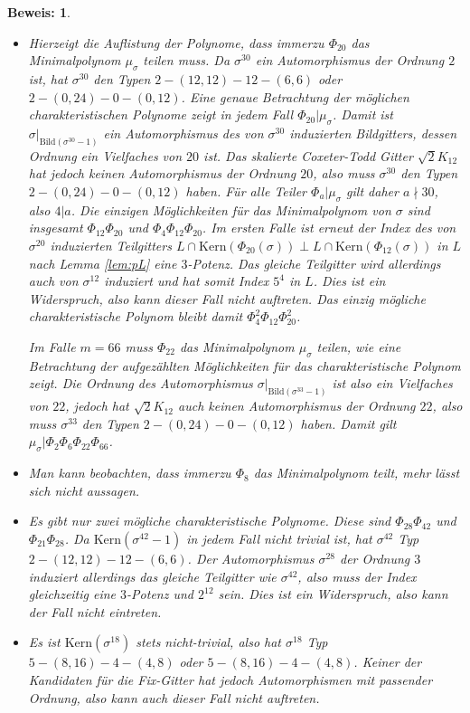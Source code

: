 \documentclass[12pt,a4paper,halfparskip,headsepline,bibtotocnumbered]{scrreprt}
\theoremstyle{nummermitklammern}
\theoremstyle{nonumberbreak}
\newtheorem{beweis}{Beweis:}
\newcommand{\Kern}{\text{Kern}}
\newcommand{\Bild}{\text{Bild}}
\begin{document}
\begin{beweis}
\begin{itemize}[align=left, leftmargin = *]
		\item[$m = 60 = 2^2 \cdot 3 \cdot 5$:] Hierzeigt die Auflistung der Polynome, dass immerzu $\Phi_{20}$ das Minimalpolynom $\mu_\sigma$ teilen muss. Da $\sigma^{30}$ ein Automorphismus der Ordnung $2$ ist, hat $\sigma^{30}$ den Typen $2 - (12, 12) - 12 - (6, 6)$ oder $2 - (0, 24) - 0 - (0, 12)$.  Eine genaue Betrachtung der möglichen charakteristischen Polynome zeigt in jedem Fall $\Phi_{20} \vert \mu_\sigma$. Damit ist $\sigma\vert_{\Bild(\sigma^{30}-1)}$ ein Automorphismus des von $\sigma^{30}$ induzierten Bildgitters, dessen Ordnung ein Vielfaches von $20$ ist. Das skalierte Coxeter-Todd Gitter $\sqrt{2}K_{12}$ hat jedoch keinen Automorphismus der Ordnung $20$, also muss $\sigma^{30}$ den Typen $2 - (0, 24) - 0 - (0, 12)$ haben. Für alle Teiler $\Phi_a \vert \mu_\sigma$ gilt daher $a \nmid 30$, also $4 \vert a$. Die einzigen Möglichkeiten für das Minimalpolynom von $\sigma$ sind insgesamt $\Phi_{12} \Phi_{20}$ und $\Phi_4 \Phi_{12} \Phi_{20}$. Im ersten Falle ist erneut der Index des von $\sigma^{20}$ induzierten Teilgitters $L \cap \Kern(\Phi_{20}(\sigma)) \perp L \cap \Kern(\Phi_{12}(\sigma))$ in $L$ nach Lemma \eqref{lem:pL} eine $3$-Potenz. Das gleiche Teilgitter wird allerdings auch von $\sigma^{12}$ induziert und hat somit Index $5^4$ in $L$. Dies ist ein Widerspruch, also kann dieser Fall nicht auftreten. Das einzig mögliche charakteristische Polynom bleibt damit $\Phi_4^2 \Phi_{12} \Phi_{20}^2$.\par
	Im Falle $m = 66$ muss $\Phi_{22}$ das Minimalpolynom $\mu_\sigma$ teilen, wie eine Betrachtung der aufgezählten Möglichkeiten für das charakteristische Polynom zeigt. Die Ordnung des Automorphismus $\sigma\vert_{\Bild(\sigma^{33}-1)}$ ist also ein Vielfaches von $22$, jedoch hat $\sqrt{2} K_{12}$ auch keinen Automorphismus der Ordnung $22$, also muss $\sigma^{33}$ den Typen $2 - (0, 24) - 0 - (0, 12)$ haben. Damit gilt $\mu_\sigma \vert \Phi_{2} \Phi_{6} \Phi_{22} \Phi_{66}$.
		\item[$m = 72 = 2^3 \cdot 3^2$:] Man kann beobachten, dass immerzu $\Phi_8$ das Minimalpolynom teilt, mehr lässt sich nicht aussagen.
		\item[$m = 84 = 2^2 \cdot 3 \cdot 7$:] Es gibt nur zwei mögliche charakteristische Polynome. Diese sind $\Phi_{28} \Phi_{42}$ und $\Phi_{21} \Phi_{28}$. Da $\Kern(\sigma^{42}-1)$ in jedem Fall nicht trivial ist, hat $\sigma^{42}$ Typ $2 - (12, 12) - 12 - (6, 6)$. Der Automorphismus $\sigma^{28}$ der Ordnung $3$ induziert allerdings das gleiche Teilgitter wie $\sigma^{42}$, also muss der Index gleichzeitig eine $3$-Potenz und $2^{12}$ sein. Dies ist ein Widerspruch, also kann der Fall nicht eintreten.
		\item[$m = 90 = 2 \cdot 3^2 \cdot 5$:] Es ist $\Kern(\sigma^{18})$ stets nicht-trivial, also hat $\sigma^{18}$ Typ $5 - (8, 16) - 4 - (4, 8)$ oder $5 - (8, 16) - 4 - (4, 8)$. Keiner der Kandidaten für die Fix-Gitter hat jedoch Automorphismen mit passender Ordnung, also kann auch dieser Fall nicht auftreten.
	\end{itemize}
\end{beweis}
\end{document}
